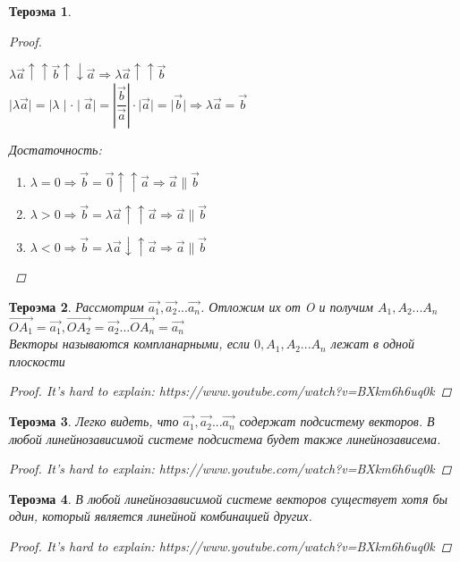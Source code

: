 \documentclass[oneside]{book}
\newtheorem{thm}{Тероэма}[chapter] %
\begin{document}
\begin{enumerate}
\begin{itemize}
\begin{enumerate}
\begin{thm}
\begin{proof}
\begin{enumerate}
				$\lambda\vec{a} \uparrow \uparrow  \vec{b} \uparrow \downarrow\vec{a} \Longrightarrow \lambda\vec{a} \uparrow \uparrow \vec{b} $\\
				$\mid \lambda\vec{a} \mid = \mid \lambda \mid \cdot \mid \vec{a} \mid = 
				\left| \dfrac{\vec{b}}{\vec{a}}\right| \cdot \mid \vec{a} \mid = \mid \vec{b} \mid\Rightarrow \lambda\vec{a}= \vec{b}$\\
				\end{enumerate}
		\par Достаточность: \\
		\begin{enumerate}
			\item $\lambda=0\Rightarrow \vec{b}=\vec{0}\uparrow \uparrow \vec{a}\Rightarrow \vec{a}\parallel \vec{b}$
			\item $\lambda>0\Rightarrow \vec{b}=\lambda\vec{a}\uparrow \uparrow \vec{a}\Rightarrow \vec{a}\parallel \vec{b}$
			\item  $\lambda<0\Rightarrow \vec{b}=\lambda\vec{a}\downarrow \uparrow \vec{a}\Rightarrow \vec{a}\parallel \vec{b}$
		\end{enumerate}
		\end{proof}
\end{thm}

\begin{thm}
	Рассмотрим $\vec{a_{1}},\vec{a_{2}}...\vec{a_{n}}$. Отложим их от O и получим $A_{1},A_{2}...A_{n}$\\
	$\vec{OA_{1}}=\vec{a_{1}},\vec{OA_{2}}=\vec{a_{2}}...\vec{OA_{n}}=\vec{a_{n}}$\\
	Векторы называются компланарными, если $0,A_{1},A_{2}...A_{n}$ лежат в одной плоскости
\begin{proof}
It's hard to explain: https://www.youtube.com/watch?v=BXkm6h6uq0k
\end{proof}
\end{thm}

\begin{thm}
	Легко видеть, что $\vec{a_{1}},\vec{a_{2}}...\vec{a_{n}}$ содержат подсистему  векторов. В любой линейнозависимой системе подсистема будет также линейнозависема.
\begin{proof}
	It's hard to explain: https://www.youtube.com/watch?v=BXkm6h6uq0k
\end{proof}
\end{thm}

\begin{thm}
	В любой линейнозависимой системе векторов существует хотя бы один, который является линейной комбинацией других.
	\begin{proof}
		It's hard to explain: https://www.youtube.com/watch?v=BXkm6h6uq0k
	\end{proof}
\end{thm}


\end{enumerate}
\end{itemize}
\end{enumerate}
\end{document}

